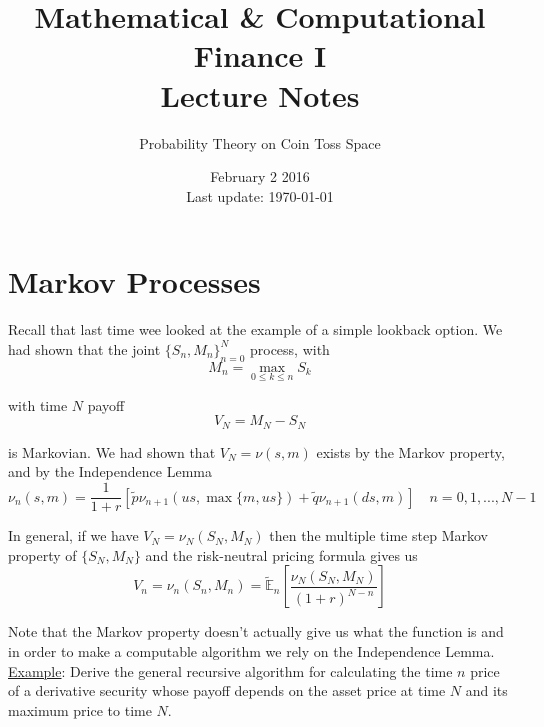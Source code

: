 \documentclass[12pt]{article}
\newlength\tindent
\renewcommand{\indent}{\hspace*{\tindent}}
\newcommand{\E}{\mathbb E}
\begin{document}
 
 
\title{Mathematical \& Computational Finance I\\Lecture Notes}
\author{Probability Theory on Coin Toss Space}
\date{February 2 2016 \\ Last update: \today{}}
\maketitle

\section{Markov Processes}

\indent Recall that last time wee looked at the example of a simple lookback option. We had shown that the joint $\{S_n,M_n\}^N_{n = 0}$ process, with
\begin{equation*}
	M_n = \max_{0 \leq k \leq n} S_k
\end{equation*}

with time $N$ payoff
\begin{equation*}
	V_N = M_N - S_N
\end{equation*}

is Markovian. We had shown that $V_N = \nu(s,m)$ exists by the Markov property, and by the Independence Lemma
\begin{equation*}
	\nu_n(s,m) = \frac{1}{1 + r}\left[ \tilde{p} \nu_{n + 1}(us, \max \{ m, us \}) + \tilde{q}\nu_{n + 1}(ds,m)\right] \quad n = 0, 1,..., N - 1
\end{equation*}

\indent In general, if we have $V_N = \nu_N(S_N, M_N)$ then the multiple time step Markov property of $\{S_N,M_N\}$ and the risk-neutral pricing formula gives us
\begin{equation*}
	V_n = \nu_n(S_n, M_n) = \tilde{\E}_n \left[ \frac{\nu_N(S_N, M_N)}{(1 + r)^{N - n}} \right]
\end{equation*}

\indent Note that the Markov property doesn't actually give us what the function is and in order to make a computable algorithm we rely on the Independence Lemma. \\

\underline{Example}: Derive the general recursive algorithm for calculating the time $n$ price of a derivative security whose payoff depends on the asset price at time $N$ and its maximum price to time $N$. \\
\end{document}
